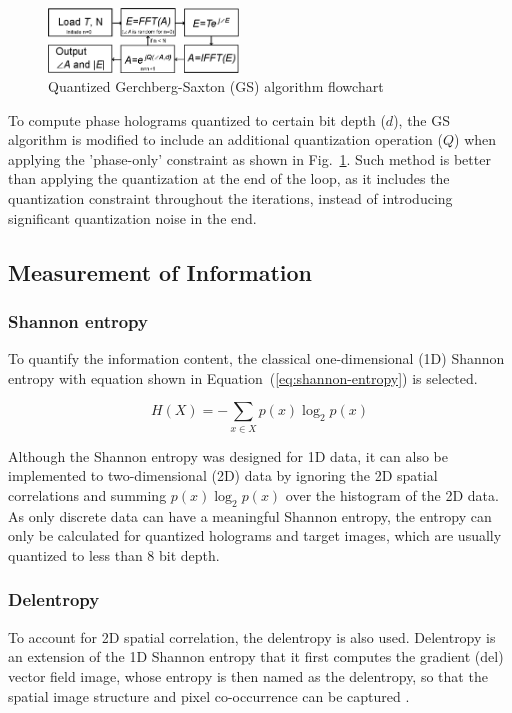 	\begin{figure} [ht]
	   \begin{center}
	   \includegraphics[width = 0.45\textwidth]{GS_quantized_flowchart.eps}
	   \end{center}
	   \caption{\label{fig:GS_quantized_flowchart} Quantized Gerchberg-Saxton (GS) algorithm flowchart}
	\end{figure} 
	
	To compute phase holograms quantized to certain bit depth ($d$), the GS algorithm is modified to include an additional quantization operation ($Q$) when applying the 'phase-only' constraint as shown in Fig.~\ref{fig:GS_quantized_flowchart}. Such method is better than applying the quantization at the end of the loop, as it includes the quantization constraint throughout the iterations, instead of introducing significant quantization noise in the end.
	
	
	
\subsection{Measurement of Information}
\subsubsection{Shannon entropy}
	To quantify the information content, the classical one-dimensional (1D) Shannon entropy \cite{Shannon1948} with equation shown in Equation~(\ref{eq:shannon-entropy}) is selected.
	
	\begin{equation}
		H(X) = -\sum_{x\in X} p(x)\log_2p(x)
		\label{eq:shannon-entropy}
	\end{equation}
	
	Although the Shannon entropy was designed for 1D data, it can also be implemented to two-dimensional (2D) data by ignoring the 2D spatial correlations and summing $p(x)\log_2p(x)$ over the histogram of the 2D data. As only discrete data can have a meaningful Shannon entropy, the entropy can only be calculated for quantized holograms and target images, which are usually quantized to less than 8 bit depth. 
	
	
\subsubsection{Delentropy} \label{sec:Delentropy}
	To account for 2D spatial correlation, the delentropy \cite{Larkin2016} is also used. Delentropy is an extension of the 1D Shannon entropy that it first computes the gradient (del) vector field image, whose entropy is then named as the delentropy, so that the spatial image structure and pixel co-occurrence can be captured \cite{Larkin2016}.
	
